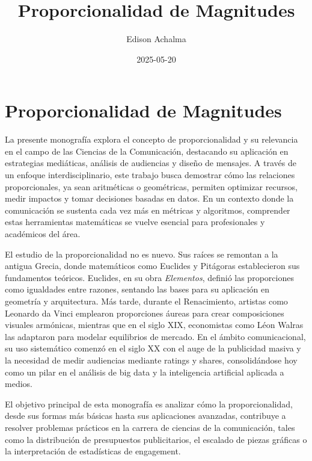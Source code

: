 \documentclass[
  stu,
  floatsintext,
  longtable,
  a4paper,
  nolmodern,
  notxfonts,
  notimes,
  colorlinks=true,linkcolor=blue,citecolor=blue,urlcolor=blue]{apa7}
\title{Proporcionalidad de Magnitudes}
\author{Edison Achalma}
\affiliation{
{Escuela Profesional de Economía, Universidad Nacional de San Cristóbal
de Huamanga}}
\date{2025-05-20}
\begin{document}
\maketitle

\hypertarget{toc}{}
\tableofcontents
\newpage
\section[Introduction]{Proporcionalidad de Magnitudes}

\setcounter{secnumdepth}{3}

\setlength\LTleft{0pt}


La presente monografía explora el concepto de proporcionalidad y su
relevancia en el campo de las Ciencias de la Comunicación, destacando su
aplicación en estrategias mediáticas, análisis de audiencias y diseño de
mensajes. A través de un enfoque interdisciplinario, este trabajo busca
demostrar cómo las relaciones proporcionales, ya sean aritméticas o
geométricas, permiten optimizar recursos, medir impactos y tomar
decisiones basadas en datos. En un contexto donde la comunicación se
sustenta cada vez más en métricas y algoritmos, comprender estas
herramientas matemáticas se vuelve esencial para profesionales y
académicos del área.

El estudio de la proporcionalidad no es nuevo. Sus raíces se remontan a
la antigua Grecia, donde matemáticos como Euclides y Pitágoras
establecieron sus fundamentos teóricos. Euclides, en su obra
\emph{Elementos}, definió las proporciones como igualdades entre
razones, sentando las bases para su aplicación en geometría y
arquitectura. Más tarde, durante el Renacimiento, artistas como Leonardo
da Vinci emplearon proporciones áureas para crear composiciones visuales
armónicas, mientras que en el siglo XIX, economistas como Léon Walras
las adaptaron para modelar equilibrios de mercado. En el ámbito
comunicacional, su uso sistemático comenzó en el siglo XX con el auge de
la publicidad masiva y la necesidad de medir audiencias mediante ratings
y shares, consolidándose hoy como un pilar en el análisis de big data y
la inteligencia artificial aplicada a medios.

El objetivo principal de esta monografía es analizar cómo la
proporcionalidad, desde sus formas más básicas hasta sus aplicaciones
avanzadas, contribuye a resolver problemas prácticos en la carrera de
ciencias de la comunicación, tales como la distribución de presupuestos
publicitarios, el escalado de piezas gráficas o la interpretación de
estadísticas de engagement.
\end{document}
